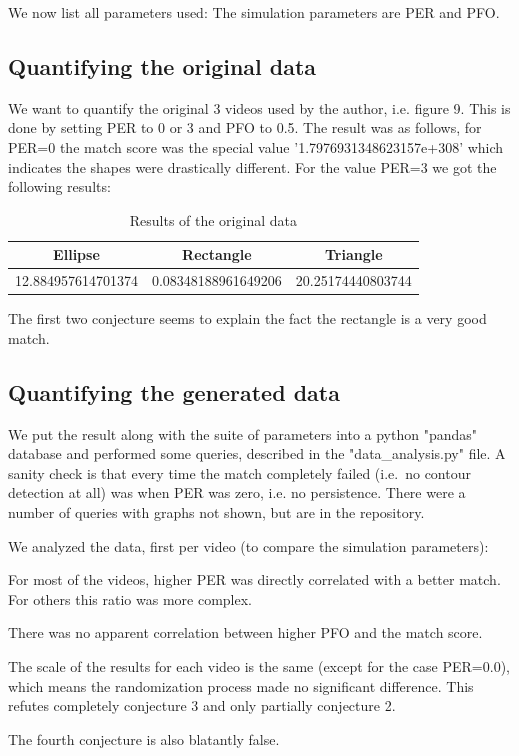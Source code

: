 \documentclass[]{article}
\begin{document}
We now list all parameters used:
The simulation parameters are PER and PFO.
\subsection{Quantifying the original data}
We want to quantify the original 3 videos used by the author, i.e. figure 9. This is done by setting PER to 0 or 3 and PFO to 0.5. The result was as follows, for PER=0 the match score was the special value '1.7976931348623157e+308' which indicates the shapes were drastically different. For the value PER=3 we got the following results:
\begin{table}[h!]
	\centering
	\begin{tabular}{|c|c|c|}
		\hline
		Ellipse & Rectangle & Triangle \\
		\hline
		12.884957614701374 & 0.08348188961649206 & 20.25174440803744  \\
		\hline
	\end{tabular}
	\caption{Results of the original data}
	\label{fig:original_results}
\end{table}

The first two conjecture seems to explain the fact the rectangle is a very good match.
\subsection{Quantifying the generated data}
We put the result along with the suite of parameters into a python "pandas" database and performed some queries, described in the "data\_analysis.py" file. A sanity check is that every time the match completely failed (i.e.\ no contour detection at all) was when PER was zero, i.e. no persistence. 
There were a number of queries with graphs not shown, but are in the repository.

We analyzed the data, first per video (to compare the simulation parameters):

For most of the videos, higher PER was directly correlated with a better match. For others this ratio was more complex.

There was no apparent correlation between higher PFO and the match score.

The scale of the results for each video is the same (except for the case PER=0.0), which means the randomization process made no significant difference. This refutes completely conjecture 3 and only partially conjecture 2.

The fourth conjecture is also blatantly false.
\end{document}
